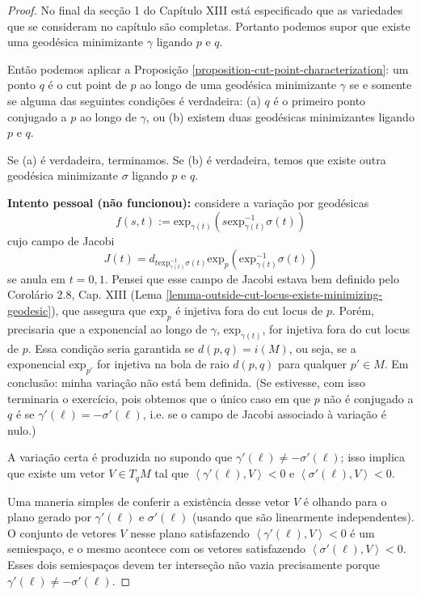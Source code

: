\begin{proof}
No final da secção 1 do Capítulo XIII está especificado que as variedades que se
consideram no capítulo são completas. Portanto podemos supor que existe
uma geodésica minimizante $\gamma$ ligando $p$ e $q$.

Então podemos aplicar a Proposição \ref{proposition-cut-point-characterization}:
 um ponto $q$ é o cut point de $p$ ao longo de uma 
geodésica minimizante $\gamma$ se e somente se
alguma das seguintes condições é verdadeira: 
(a) $q$ é o primeiro ponto conjugado a $p$ ao longo de $\gamma$, ou 
(b) existem duas geodésicas minimizantes ligando $p$ e $q$.

Se (a) é verdadeira, terminamos. Se (b) é verdadeira, temos que existe outra
geodésica minimizante $\sigma$ ligando $p$ e $q$.

{\bf Intento pessoal (não funcionou):}  considere a variação por geodésicas 
$$
f(s,t):=\text{exp}_{\gamma(t)}
(s\text{exp}_{\gamma(t)}^{-1}\sigma(t))
$$
cujo campo de Jacobi 
$$
J(t)=d_{t\text{exp}_{\gamma(t)}^{-1}\sigma(t)}
\text{exp}_p(\text{exp}_{\gamma(t)}^{-1}\sigma(t))
$$
se anula em $t=0,1$. Pensei que esse campo de Jacobi estava bem definido pelo 
Corolário 2.8, Cap. XIII (Lema 
\ref{lemma-outside-cut-locus-exists-minimizing-geodesic}), que assegura
 que $\text{exp}_p$ é injetiva fora do cut locus de $p$. Porém, precisaria
 que a exponencial ao longo de $\gamma$,
 $\text{exp}_{\gamma(t)}$, for injetiva fora do cut locus de $p$. 
Essa condição seria garantida se $d(p,q)=i(M)$, ou seja, se a exponencial
 $\text{exp}_{p'}$ for injetiva na bola de raio $d(p,q)$ para qualquer 
$p' \in M$. Em conclusão: minha variação não está bem definida. 
(Se estivesse, com
isso terminaria o exercício, pois obtemos que o único caso em que $p$ não é
conjugado a $q$ é se $\gamma'(\ell)=-\sigma'(\ell)$, i.e. se o campo de Jacobi 
associado à variação é nulo.) 

\bigskip

A variação certa é produzida no \cite{doc} supondo que 
$\gamma'(\ell)\neq -\sigma'(\ell)$; isso implica que existe um vetor
 $V \in T_q M$ tal que 
$\left<\gamma'(\ell),V\right>< 0$ e $\left<\sigma'(\ell),V\right>< 0$.

Uma maneria simples de conferir a existência desse vetor $V$ é olhando para o 
plano gerado por $\gamma'(\ell)$ e $\sigma'(\ell)$ (usando que são linearmente
independentes). O conjunto de vetores $V$ nesse plano satisfazendo 
$\left<\gamma'(\ell),V\right><0$ é um semiespaço, e o mesmo acontece com 
 os vetores satisfazendo $\left<\sigma'(\ell),V\right><0$. Esses dois semiespaços
devem ter interseção não vazia precisamente porque 
$\gamma'(\ell)\neq -\sigma'(\ell)$.


\end{proof}
